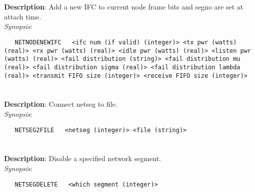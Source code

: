 \section{\quad{}}
\label{manpages:NETNODENEWIFC}
\label{manpages:netnodenewifc}
\vspace{-0.1in}
{\bf Description}: 	Add a new IFC to current node frame bits and segno are set at attach time.\\[1.5ex]
{\em Synopsis}:
\vspace{-0.05in}
\scriptsize
\begin{lstlisting}
   NETNODENEWIFC   <ifc num (if valid) (integer)> <tx pwr (watts) (real)> <rx pwr (watts) (real)> <idle pwr (watts) (real)> <listen pwr (watts) (real)> <fail distribution (string)> <fail distribution mu (real)> <fail distribution sigma (real)> <fail distribution lambda (real)> <transmit FIFO size (integer)> <receive FIFO size (integer)> 
\end{lstlisting}
\normalsize
\vspace{-0.05in}


\section{\quad{}}
\label{manpages:NETSEG2FILE}
\label{manpages:netseg2file}
\vspace{-0.1in}
{\bf Description}: 	Connect netseg to file.\\[1.5ex]
{\em Synopsis}:
\vspace{-0.05in}
\scriptsize
\begin{lstlisting}
   NETSEG2FILE   <netseg (integer)> <file (string)>																		
\end{lstlisting}
\normalsize
\vspace{-0.05in}


\section{\quad{}}
\label{manpages:NETSEGDELETE}
\label{manpages:netsegdelete}
\vspace{-0.1in}
{\bf Description}: 	Disable a specified network segment.\\[1.5ex]
{\em Synopsis}:
\vspace{-0.05in}
\scriptsize
\begin{lstlisting}
   NETSEGDELETE   <which segment (integer)>																		
\end{lstlisting}
\normalsize
\vspace{-0.05in}


